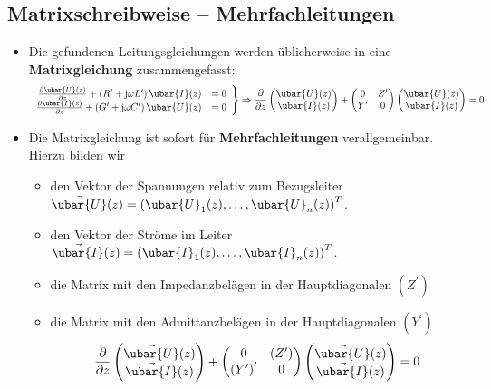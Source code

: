\subsection{Matrixschreibweise -- Mehrfachleitungen}
\begin{itemize}
	\item Die gefundenen Leitungsgleichungen werden üblicherweise in eine \textbf{Matrixgleichung} zusammengefasst:
	\begin{equation}
		\left.
		\begin{array}{rl}
			\frac{\partial  \ubar{U}(z)}{\partial z} + \left(R^\prime + \mathrm{j}\omega L^\prime\right)  \ubar{I}(z) & = 0 \\
			\frac{\partial  \ubar{I}(z)}{\partial z} +\left(G^\prime + \mathrm{j}\omega C^\prime\right)  \ubar{U}(z)  & = 0
		\end{array}\right\} \Rightarrow
		\frac{\partial}{\partial z}\begin{pmatrix} \ubar{U}(z)\\ \ubar{I}(z) \end{pmatrix}
		+
		\begin{pmatrix}
			0        & Z^\prime \\
			Y^\prime & 0
		\end{pmatrix}
		\begin{pmatrix} \ubar{U}(z)\\ \ubar{I}(z) \end{pmatrix} = 0
	\end{equation}
	\item Die Matrixgleichung ist sofort für \textbf{Mehrfachleitungen} verallgemeinbar. Hierzu bilden wir
	\begin{itemize}
		\item den Vektor der Spannungen relativ zum Bezugsleiter \(\vec{ \ubar{U}}(z) = \left( \ubar{U}_1(z),\ldots ,  \ubar{U}_n(z) \right)^T\).
		\item den Vektor der Ströme im Leiter  \(\vec{ \ubar{I}}(z) = \left( \ubar{I}_1(z),\ldots ,  \ubar{I}_n(z) \right)^T\).
		\item die Matrix mit den Impedanzbelägen in der Hauptdiagonalen \(\left(Z^\prime\right)\)
		\item die Matrix mit den Admittanzbelägen in der Hauptdiagonalen \(\left(Y^\prime\right)\)
		\begin{equation}
			\frac{\partial}{\partial z}\begin{pmatrix}\vec{ \ubar{U}}(z)\\\vec{ \ubar{I}}(z) \end{pmatrix}
			+
			\begin{pmatrix}
				0                            & \left(Z^\prime\right) \\
				\left(Y^\prime\right)^\prime & 0
			\end{pmatrix}
			\begin{pmatrix}\vec{ \ubar{U}}(z)\\\vec{ \ubar{I}}(z) \end{pmatrix} = 0
		\end{equation}
		
	\end{itemize}
\end{itemize}
